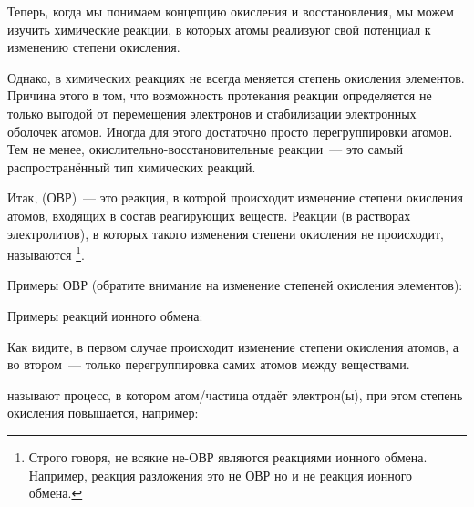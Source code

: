 Теперь, когда мы понимаем концепцию окисления и восстановления, мы можем изучить химические реакции, в которых атомы реализуют свой потенциал к изменению степени окисления.

Однако, в химических реакциях не всегда меняется степень окисления элементов. Причина этого в том, что возможность протекания реакции определяется не только выгодой от перемещения электронов и стабилизации электронных оболочек атомов. Иногда для этого достаточно просто перегруппировки атомов. Тем не менее, окислительно-восстановительные реакции~--- это самый распространённый тип химических реакций.

Итак,  (ОВР)~--- это реакция, в которой происходит изменение степени окисления атомов, входящих в состав реагирующих веществ. Реакции (в растворах электролитов), в которых такого изменения степени окисления не происходит, называются \footnote{Строго говоря, не всякие не-ОВР являются реакциями ионного обмена. Например, реакция разложения  это не ОВР но и не реакция ионного обмена.}.

Примеры ОВР (обратите внимание на изменение степеней окисления элементов):


Примеры реакций ионного обмена:


Как видите, в первом случае происходит изменение степени окисления атомов, а во втором~--- только перегруппировка самих атомов между веществами.

 называют процесс, в котором атом/частица отдаёт электрон(ы), при этом степень окисления повышается, например:

